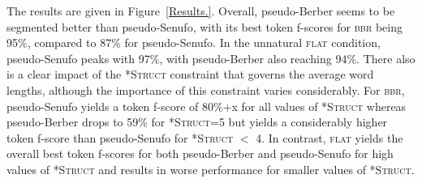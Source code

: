 \documentclass[11pt]{article}
\begin{document}
The results are given in Figure~\ref{Results.}. Overall, pseudo-Berber seems to be segmented better than pseudo-Senufo, with its best token f-scores for \textsc{bbr} being 95\%, compared to 87\% for pseudo-Senufo. In the unnatural \textsc{flat} condition, pseudo-Senufo peaks with 97\%, with pseudo-Berber also reaching 94\%. There also is a clear impact of the \textsc{*Struct} constraint that governs the average word lengths, although the importance of this constraint varies considerably. For \textsc{bbr}, pseudo-Senufo yields a token f-score of 80\%+x for all values of \textsc{*Struct} whereas pseudo-Berber drops to 59\% for \textsc{*Struct}=5 but yields a considerably higher token f-score than pseudo-Senufo for \textsc{*Struct} $<$ 4. In contrast, \textsc{flat} yields the overall best token f-scores for both pseudo-Berber and pseudo-Senufo for high values of \textsc{*Struct} and results in worse performance for smaller values of \textsc{*Struct}.
\end{document}
